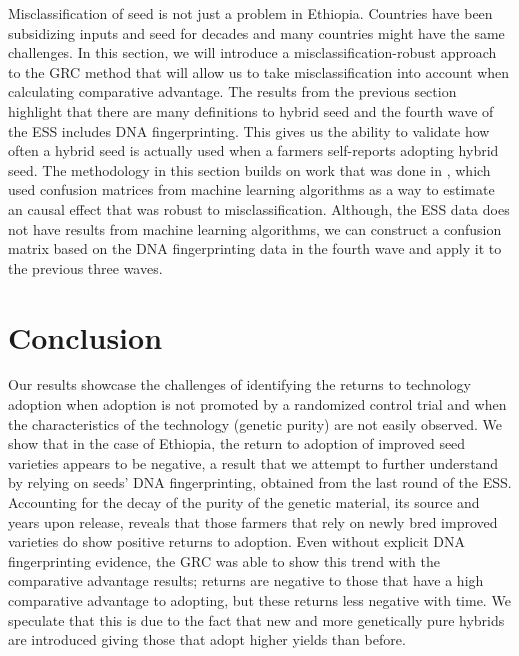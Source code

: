 \documentclass[11pt]{article}
\begin{document}
Misclassification of seed is not just a problem in Ethiopia. Countries have been subsidizing inputs and seed for decades and many countries might have the same challenges. In this section, we will introduce a misclassification-robust approach to the GRC method that will allow us to take misclassification into account when calculating comparative advantage. The results from the previous section highlight that there are many definitions to hybrid seed and the fourth wave of the ESS includes DNA fingerprinting. This gives us the ability to validate how often a hybrid seed is actually used when a farmers self-reports adopting hybrid seed. The methodology in this section builds on work that was done in \cite{michuda2021three}, which used confusion matrices from machine learning algorithms as a way to estimate an causal effect that was robust to misclassification. Although, the ESS data does not have results from machine learning algorithms, we can construct a confusion matrix based on the DNA fingerprinting data in the fourth wave and apply it to the previous three waves.




\section{Conclusion}\label{sec:conclusion}


Our results showcase the challenges of identifying the returns to technology adoption when adoption is not promoted by a randomized control trial and when the characteristics of the technology (genetic purity) are not easily observed. We show that in the case of Ethiopia, the return to adoption of improved seed varieties appears to be negative, a result that we attempt to further understand by relying on seeds' DNA fingerprinting, obtained from the last round of the ESS. Accounting for the decay of the purity of the genetic material, its source and years upon release, reveals that those farmers that rely on newly bred improved varieties do show positive returns to adoption. Even without explicit DNA fingerprinting evidence, the GRC was able to show this trend with the comparative advantage results; returns are negative to those that have a high comparative advantage to adopting, but these returns less negative with time. We speculate that this is due to the fact that new and more genetically pure hybrids are introduced giving those that adopt higher yields than before.
\end{document}
